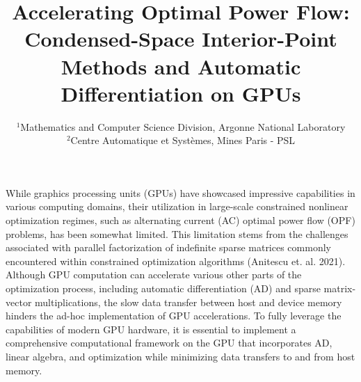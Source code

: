 
\title{Accelerating Optimal Power Flow: Condensed-Space Interior-Point Methods and Automatic Differentiation on GPUs}

\author{
\and
{}
}

\date{\small
  $^{1}$Mathematics and Computer Science Division, Argonne National Laboratory\\
  $^{2}$Centre Automatique et Syst\`{e}mes, Mines Paris - PSL
}

\maketitle

While graphics processing units (GPUs) have showcased impressive capabilities in various computing domains, their utilization in large-scale constrained nonlinear optimization regimes, such as alternating current (AC) optimal power flow (OPF) problems, has been somewhat limited. This limitation stems from the challenges associated with parallel factorization of indefinite sparse matrices commonly encountered within constrained optimization algorithms (Anitescu et. al. 2021). Although GPU computation can accelerate various other parts of the optimization process, including automatic differentiation (AD) and sparse matrix-vector multiplications, the slow data transfer between host and device memory hinders the ad-hoc implementation of GPU accelerations. To fully leverage the capabilities of modern GPU hardware, it is essential to implement a comprehensive computational framework on the GPU that incorporates AD, linear algebra, and optimization while minimizing data transfers to and from host memory.

